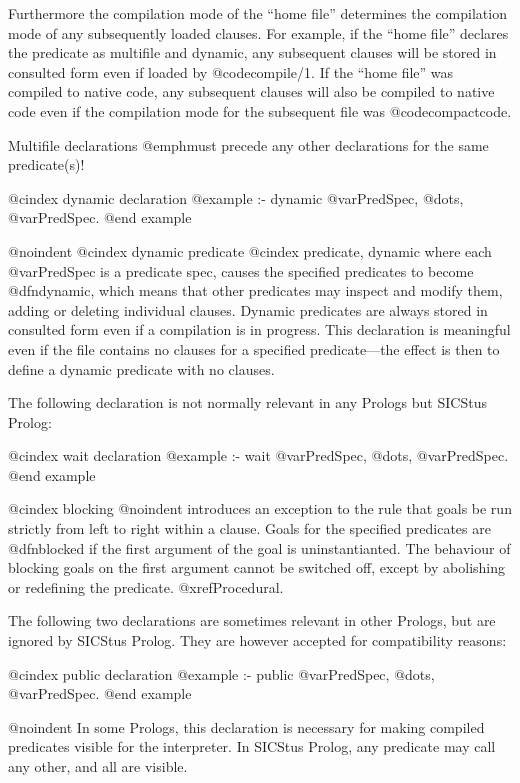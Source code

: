 Furthermore the compilation mode of the ``home file'' determines the
compilation mode of any subsequently loaded clauses.  For example, if
the ``home file'' declares the predicate as multifile and dynamic, any
subsequent clauses will be stored in consulted form even if loaded by
@code{compile/1}.  If the ``home file'' was compiled to native code, any
subsequent clauses will also be compiled to native code even if the
compilation mode for the subsequent file was @code{compactcode}.

Multifile declarations @emph{must precede} any other declarations for
the same predicate(s)!

@cindex dynamic declaration
@example
:- dynamic @var{PredSpec}, @dots{}, @var{PredSpec}.
@end example

@noindent
@cindex dynamic predicate
@cindex predicate, dynamic
where each @var{PredSpec} is a predicate spec, causes the specified
predicates to become @dfn{dynamic}, which means that other predicates
may inspect and modify them, adding or deleting individual clauses.
Dynamic predicates are always stored in consulted form even if a
compilation is in progress.  This declaration is meaningful even if the
file contains no clauses for a specified predicate---the effect is then
to define a dynamic predicate with no clauses.

The following declaration is not normally relevant in any Prologs but
SICStus Prolog:

@cindex wait declaration
@example
:- wait @var{PredSpec}, @dots{}, @var{PredSpec}.
@end example

@cindex blocking
@noindent
introduces an exception to the rule that goals be run strictly from left
to right within a clause.  Goals for the specified predicates are
@dfn{blocked} if the first argument of the goal is uninstantianted.  The
behaviour of blocking goals on the first argument cannot be switched
off, except by abolishing or redefining the predicate.
@xref{Procedural}.

The following two declarations are sometimes relevant in other Prologs,
but are ignored by SICStus Prolog.  They are however accepted for
compatibility reasons:

@cindex public declaration
@example
:- public @var{PredSpec}, @dots{}, @var{PredSpec}.
@end example

@noindent
In some Prologs, this declaration is necessary for making compiled 
predicates visible for the interpreter.  In SICStus Prolog, any
predicate may call any other, and all are visible.

